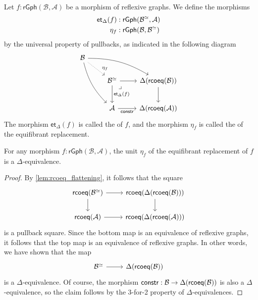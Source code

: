 \begin{defn}
Let $f:\mathsf{rGph}(\mathcal{B},\mathcal{A})$ be a morphism of reflexive graphs. We define the morphisms
\begin{align*}
\mathsf{et}_\Delta(f) & : \mathsf{rGph}(\mathcal{B}^{\simeq},\mathcal{A}) \\
\mathsf{\eta}_f & : \mathsf{rGph}(\mathcal{B},\mathcal{B}^{\simeq})
\end{align*}
by the universal property of pullbacks, as indicated in the following diagram
\begin{equation*}
\begin{tikzcd}
\mathcal{B} \arrow[ddr,bend right=15] \arrow[drr,bend left=15] \arrow[dr,densely dotted,"\eta_f" near end] \\
& \mathcal{B}^{\eqvsym} \arrow[dr,phantom,"\lrcorner" {very near start,xshift=-1ex}] \arrow[d,"\mathsf{et}_\Delta(f)"] \arrow[r] & \Delta(\rcoeq(\mathcal{B})) \arrow[d] \\[1ex]
& \mathcal{A} \arrow[r,swap,"\mathsf{constr}"] & \Delta(\rcoeq(\mathcal{A}))
\end{tikzcd}
\end{equation*}
The morphism $\mathsf{et}_\Delta(f)$ is called the  of $f$, and the morphism $\eta_f$ is called the  of the equifibrant replacement.
\end{defn}

\begin{lem}
For any morphism $f:\mathsf{rGph}(\mathcal{B},\mathcal{A})$, the unit $\eta_f$ of the equifibrant replacement of $f$ is a $\Delta$-equivalence. 
\end{lem}

\begin{proof}
By \cref{lem:rcoeq_flattening}, it follows that the square
\begin{equation*}
\begin{tikzcd}
\rcoeq(\mathcal{B}^{\eqvsym}) \arrow[d] \arrow[r] & \rcoeq(\Delta(\rcoeq(\mathcal{B}))) \arrow[d] \\
\rcoeq(\mathcal{A}) \arrow[r] & \rcoeq(\Delta(\rcoeq(\mathcal{A})))
\end{tikzcd}
\end{equation*}
is a pullback square. Since the bottom map is an equivalence of reflexive graphs, it follows that the top map is an equivalence of reflexive graphs. In other words, we have shown that the map
\begin{equation*}
\begin{tikzcd}
\mathcal{B}^{\eqvsym} \arrow[r] & \Delta(\rcoeq(\mathcal{B}))
\end{tikzcd}
\end{equation*}
is a $\Delta$-equivalence. Of course, the morphism $\mathsf{constr}:\mathcal{B}\to\Delta(\mathsf{rcoeq}(\mathcal{B}))$ is also a $\Delta$-equivalence, so the claim follows by the 3-for-2 property of $\Delta$-equivalences.
\end{proof}

